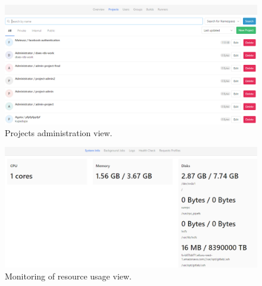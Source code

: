 \begin{appendix}
\begin{figure}[!htbp]
		\end{figure}		
		\begin{figure}[!htbp]
			\centering
			\includegraphics[width=1\textwidth]{img/ug-administartion/projects}
			\caption{Projects administration view.}
			\label{fig:projects-administration-view}
		\end{figure}		
		\begin{figure}[!htbp]
			\centering
			\includegraphics[width=1\textwidth]{img/ug-administartion/monitoring}
			\caption{Monitoring of resource usage view.}
			\label{fig:resource-usage-view}
		\end{figure}		
\end{appendix}